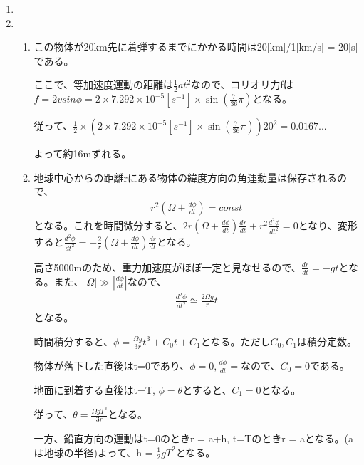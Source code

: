 \documentclass{jsarticle}
\newenvironment{problems}
{
  \renewcommand\labelenumi{\doublebox{\arabic{enumi}}}
  \begin{enumerate}
}{
  \end{enumerate}
  \renewcommand\labelenumi{\arabic{enumi}.}
}
\begin{document}
\begin{problems}
変数:  λ:経度, φ:緯度, a:地球の半径, f:摩擦力, u:x方向(緯線)の速度, v:y方向(経線)の速度, ρ: 気体の密度, p: 気圧, g:重力加速度
\item 

\item 
	\begin{enumerate}[(1)]
        \item 

        この物体が20km先に着弾するまでにかかる時間は20[km]/1[km/s] = 20[s]である。

        ここで、等加速度運動の距離は$\frac{1}{2}at^2$なので、コリオリ力fは$f=2vsin\phi =2\times7.292 \times 10^{-5}[s^{-1}] \times\sin(\frac{7}{36}\pi)$となる。
        
        従って、$\frac{1}{2} \times (2\times7.292 \times 10^{-5}[s^{-1}] \times\sin(\frac{7}{36}\pi)) 20^2 = 0.0167... $
        
        よって約16mずれる。

        \item
        地球中心からの距離rにある物体の緯度方向の角運動量は保存されるので、
        \begin{eqnarray}
            r^2\left(\Omega + \frac{d\phi}{dt}\right) = const
        \end{eqnarray}
        となる。これを時間微分すると、$2r(\Omega + \frac{d\phi}{dt})\frac{dr}{dt} + r^2\frac{d^2\phi}{dt^2} = 0$となり、変形すると$\frac{d^2\phi}{dt^2} = -\frac{2}{r}(\Omega + \frac{d\phi}{dt})\frac{dr}{dt}$となる。

        高さ5000mのため、重力加速度がほぼ一定と見なせるので、$\frac{dr}{dt} = -gt$となる。また、$|\Omega| \gg |\frac{d\phi}{dt}|$なので、
        \begin{eqnarray}
        \frac{d^2 \phi}{dt^2} \simeq \frac{2\Omega g}{r} t
        \end{eqnarray}
        となる。

        時間積分すると、$\phi = \frac{\Omega g}{3r}t^3 + C_0t + C_1$となる。ただし$C_0,C_1$は積分定数。

        物体が落下した直後はt=0であり、$\phi=0, \frac{d\phi}{dt}=$なので、$C_0 = 0$である。
        
        地面に到着する直後はt=T, $\phi = \theta$とすると、$C_1=0$となる。

        従って、$\theta = \frac{\Omega g T^3}{3r}$となる。

        一方、鉛直方向の運動はt=0のときr = a+h, t=Tのときr = aとなる。(aは地球の半径)よって、h = $\frac{1}{2}gT^2$となる。


\end{enumerate}
\end{problems}
\end{document}

